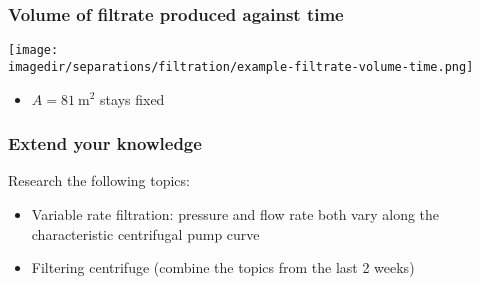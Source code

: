 \begin{frame}\frametitle{Volume of filtrate produced against time}
	\begin{center}
		\texttt{[image: \\imagedir/separations/filtration/example-filtrate-volume-time.png]}
	\end{center}
	\begin{itemize}
		\item	$A = 81~\text{m}^2$ stays fixed
	\end{itemize}	
\end{frame}



\begin{frame}\frametitle{Extend your knowledge}
	Research the following topics:
	\begin{itemize}
		\item	Variable rate filtration: pressure and flow rate both vary along the characteristic centrifugal pump curve
		\item	Filtering centrifuge (combine the topics from the last 2 weeks)
	\end{itemize}
\end{frame}


